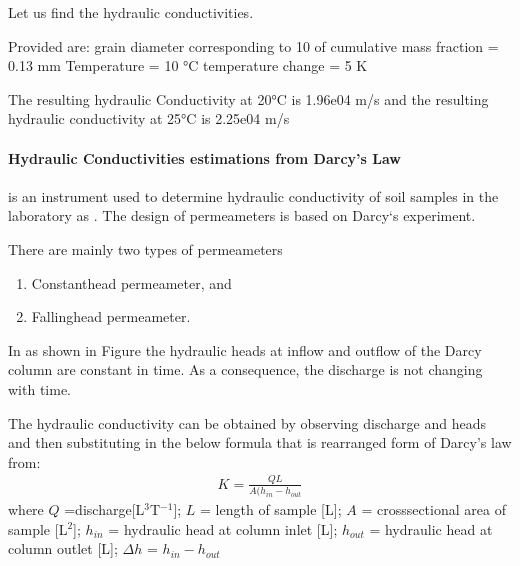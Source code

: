 \documentclass[letterpaper,10pt,english]{sphinxmanual}
\let\sphinxpxdimen\pdfpxdimen\else\newdimen\sphinxpxdimen
\begin{document}
\begin{sphinxVerbatim}[commandchars=\\\{\}]
Let us find the hydraulic conductivities.

Provided are:
grain diameter corresponding to 10\PYGZpc{} of cumulative mass fraction = 0.13 mm
Temperature = 10 °C
temperature change = 5 K 

The resulting hydraulic Conductivity at 20°C is 1.96e\PYGZhy{}04 m/s 
and the resulting hydraulic conductivity at 25°C is 2.25e\PYGZhy{}04 m/s
\end{sphinxVerbatim}


\paragraph{Hydraulic Conductivities estimations from Darcy’s Law}
\label{\detokenize{contents/flow/lecture_04/14_darcy_law_K:hydraulic-conductivities-estimations-from-darcy-s-law}}
 is an instrument used to determine hydraulic conductivity of soil samples
in the laboratory as . The design of permeameters is based on Darcy‘s
experiment.

\noindent\sphinxincludegraphics[width=250\sphinxpxdimen]{{L4_f4}.png}

There are mainly two types of permeameters
\begin{enumerate}
%
\item {} 
Constant\sphinxhyphen{}head permeameter, and

\item {} 
Falling\sphinxhyphen{}head permeameter.

\end{enumerate}

In  as
shown in Figure the hydraulic heads at inflow and outflow of the Darcy column are
constant in time. As a consequence, the discharge is not changing with time.

\noindent\sphinxincludegraphics[width=250\sphinxpxdimen]{{L4_f5}.png}

The
hydraulic conductivity can be obtained by observing discharge and heads and then
substituting in the below formula that is rearranged form of Darcy’s law from:
\begin{equation*}
\begin{split}
K = \frac{QL}{A(h_{in}- h_{out}}
\end{split}
\end{equation*}
where \(Q\) =discharge{[}L\(^3\)T\(^{-1}\){]};
\(L\) = length of sample {[}L{]};  \(A\) = cross\sphinxhyphen{}sectional area of sample {[}L\(^2\){]}; 
\(h_{in}\) = hydraulic head at column inlet {[}L{]};
\(h_{out}\) = hydraulic head at column outlet {[}L{]};
\(\Delta h\) = \(h_{in} - h_{out}\)
\end{document}
